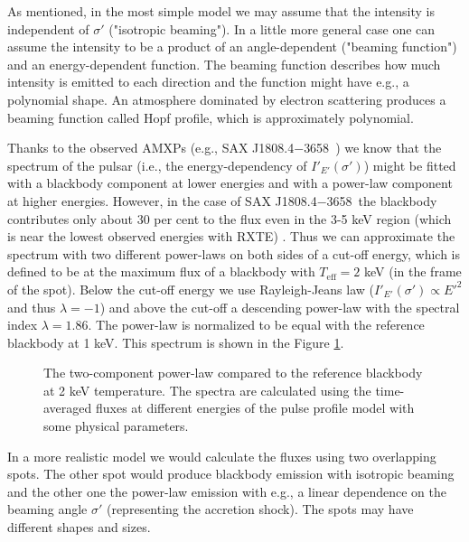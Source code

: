 \documentclass{wihuri}
\def\Dop{\delta}
\def\source{SAX J1808.4$-$3658}
\begin{document}

As mentioned, in the most simple model we may assume that the intensity is independent of $\sigma'$ ("isotropic beaming"). In a little more general case one can assume the intensity to be a product of an angle-dependent ("beaming function") and an energy-dependent function. The beaming function describes how much intensity is emitted to each direction and the function might have e.g., a polynomial shape. An atmosphere dominated by electron scattering produces a beaming function called Hopf profile, which is approximately polynomial.  


Thanks to the observed AMXPs (e.g., \source \ \cite{poutagierlinskisax}) we know that the spectrum of the pulsar (i.e., the energy-dependency of $I'_{E'}(\sigma')$) might be fitted with a blackbody component at lower energies and with a power-law component at higher energies. However, in the case of \source \ the blackbody contributes only about 30 per cent to the flux even in the 3-5 keV region (which is near the lowest observed energies with RXTE) \cite{poutagierlinskisax}. Thus we can approximate the spectrum with two different power-laws on both sides of a cut-off energy, which is defined to be at the maximum flux of a blackbody with $T_{\mathrm{eff}} = 2 $ keV (in the frame of the spot). Below the cut-off energy we use Rayleigh-Jeans law ($I'_{E'}(\sigma') \propto E '^{2}$ and thus $\lambda = -1$) and above the cut-off a descending power-law with the spectral index $\lambda = 1.86$. The power-law is normalized to be equal with the reference blackbody at 1 keV. This spectrum is shown in the Figure \ref{fig:spectrum}.


\begin{figure}
\centerline{}
\caption{The two-component power-law compared to the reference blackbody at 2 keV temperature. The spectra are calculated using the time-averaged fluxes at different energies of the pulse profile model with some physical parameters. 
\label{fig:spectrum}}
\end{figure}


In a more realistic model we would calculate the fluxes using two overlapping spots. The other spot would produce blackbody emission with isotropic beaming and the other one the power-law emission with e.g., a linear dependence on the beaming angle $\sigma'$ (representing the accretion shock). The spots may have different shapes and sizes. %
\end{document}
